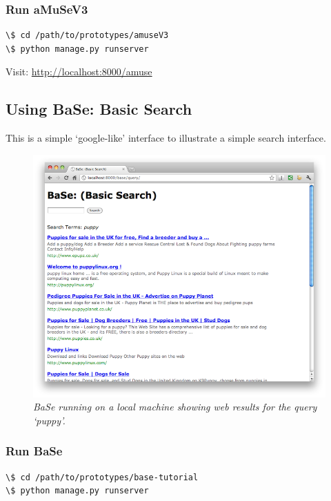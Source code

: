 \documentclass[letterpaper,10pt,english]{sphinxmanual}
\begin{document}
\subsubsection{Run aMuSeV3}
\label{prototypes:run-amusev3}
\begin{Verbatim}[commandchars=\\\{\}]
\$ cd /path/to/prototypes/amuseV3
\$ python manage.py runserver
\end{Verbatim}

Visit: \href{http://localhost:8000/amuse}{http://localhost:8000/amuse}


\subsection{Using BaSe: Basic Search}
\label{prototypes:using-base-basic-search}
This is a simple `google-like' interface to illustrate a simple search interface.
\begin{figure}[htbp]
\centering
\capstart

\includegraphics{puppy-base.png}
\caption{\emph{BaSe running on a local machine showing web results for the query `puppy'.}}\end{figure}


\subsubsection{Run BaSe}
\label{prototypes:run-base}
\begin{Verbatim}[commandchars=\\\{\}]
\$ cd /path/to/prototypes/base-tutorial
\$ python manage.py runserver
\end{Verbatim}
\end{document}
